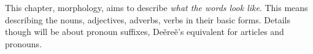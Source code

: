 This chapter, morphology, aims to describe \emph{what the words look like}.
This means describing the nouns, adjectives, adverbs, verbs in their basic forms.
Details though will be about pronoun suffixes, Deẽreẽ’s equivalent for articles and pronouns.






